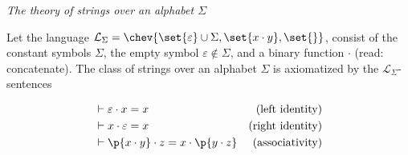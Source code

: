 \begin{definition} \emph{The theory of strings over an alphabet $\Sigma$}

Let the language
$\mathcal{L}_\Sigma=\chev{\set{\varepsilon}\cup\Sigma,\set{x\cdot y},\set{}}$,
consist of the constant symbols $\Sigma$, the empty symbol $\varepsilon \notin
\Sigma$, and a binary function $\cdot$ (read: concatenate). The class of
strings over an alphabet $\Sigma$ is axiomatized by the
$\mathcal{L}_\Sigma$-sentences

\begin{align}
&\vdash \varepsilon \cdot x = x & \text{(left identity)} \\
&\vdash x \cdot \varepsilon = x & \text{(right identity)} \\
&\vdash \p{ x \cdot y } \cdot z = x \cdot \p{ y \cdot z } & \text{(associativity)}
\end{align}

\end{definition}

